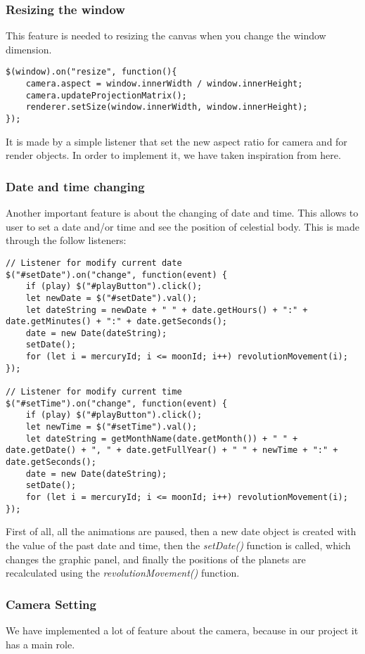 \documentclass{article}
\begin{document}
\subsubsection{Resizing the window}
This feature is needed to resizing the canvas when you change the window dimension. 
\begin{lstlisting}
$(window).on("resize", function(){
	camera.aspect = window.innerWidth / window.innerHeight;
	camera.updateProjectionMatrix();
	renderer.setSize(window.innerWidth, window.innerHeight);
});
\end{lstlisting}
It is made by a simple listener that set the new aspect ratio for camera and for render objects. In order to implement it, we have taken inspiration from here\cite{resizing:stackoverflow}.

\subsubsection{Date and time changing} 
Another important feature is about the changing of date and time. This allows to user to set a date and/or time and see the position of celestial body. This is made through the follow listeners:
\begin{lstlisting}
// Listener for modify current date
$("#setDate").on("change", function(event) {
	if (play) $("#playButton").click();
	let newDate = $("#setDate").val();
	let dateString = newDate + " " + date.getHours() + ":" + date.getMinutes() + ":" + date.getSeconds();
	date = new Date(dateString);
	setDate();
	for (let i = mercuryId; i <= moonId; i++) revolutionMovement(i);
});

// Listener for modify current time
$("#setTime").on("change", function(event) {
	if (play) $("#playButton").click();
	let newTime = $("#setTime").val();
	let dateString = getMonthName(date.getMonth()) + " " + date.getDate() + ", " + date.getFullYear() + " " + newTime + ":" + date.getSeconds();
	date = new Date(dateString);
	setDate();
	for (let i = mercuryId; i <= moonId; i++) revolutionMovement(i);
});
\end{lstlisting}
First of all, all the animations are paused, then a new date object is created with the value of the past date and time, then the \textit{setDate()} function is called, which changes the graphic panel, and finally the positions of the planets are recalculated using the \textit{revolutionMovement()} function.

\subsubsection{Camera Setting}
We have implemented a lot of feature about the camera, because in our project it has a main role.
\end{document}
